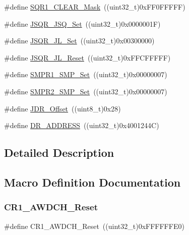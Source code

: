 \begin{DoxyCompactItemize}
\item 
\#define \mbox{\hyperlink{group___a_d_c___private___defines_ga6e3e238f38d7ff17939cbd5417fc51cc}{S\+Q\+R1\+\_\+\+C\+L\+E\+A\+R\+\_\+\+Mask}}~((uint32\+\_\+t)0x\+F\+F0\+F\+F\+F\+F\+F)
\item 
\#define \mbox{\hyperlink{group___a_d_c___private___defines_ga5d460390dbe3b400b5e0fdf1e94929f0}{J\+S\+Q\+R\+\_\+\+J\+S\+Q\+\_\+\+Set}}~((uint32\+\_\+t)0x0000001\+F)
\item 
\#define \mbox{\hyperlink{group___a_d_c___private___defines_ga46af9e738702305be0127f6c15c4f7b0}{J\+S\+Q\+R\+\_\+\+J\+L\+\_\+\+Set}}~((uint32\+\_\+t)0x00300000)
\item 
\#define \mbox{\hyperlink{group___a_d_c___private___defines_gac8d1173791ea10bac7c53a368d593a16}{J\+S\+Q\+R\+\_\+\+J\+L\+\_\+\+Reset}}~((uint32\+\_\+t)0x\+F\+F\+C\+F\+F\+F\+F\+F)
\item 
\#define \mbox{\hyperlink{group___a_d_c___private___defines_ga244048ec3ba9461a6609942def9a15ba}{S\+M\+P\+R1\+\_\+\+S\+M\+P\+\_\+\+Set}}~((uint32\+\_\+t)0x00000007)
\item 
\#define \mbox{\hyperlink{group___a_d_c___private___defines_ga6555beb1970c42125678d80530bba4d3}{S\+M\+P\+R2\+\_\+\+S\+M\+P\+\_\+\+Set}}~((uint32\+\_\+t)0x00000007)
\item 
\#define \mbox{\hyperlink{group___a_d_c___private___defines_ga5671a68d6f0d01c6c465ee7a3a8f3eea}{J\+D\+R\+\_\+\+Offset}}~((uint8\+\_\+t)0x28)
\item 
\#define \mbox{\hyperlink{group___a_d_c___private___defines_ga35ecb1c96cfae175f5f00490e5e91e88}{D\+R\+\_\+\+A\+D\+D\+R\+E\+SS}}~((uint32\+\_\+t)0x4001244\+C)
\end{DoxyCompactItemize}


\subsection{Detailed Description}


\subsection{Macro Definition Documentation}
\mbox{\label{group___a_d_c___private___defines_gabe7e68383d281e58707a1cd749a3374e}} 
\subsubsection{\texorpdfstring{CR1\_AWDCH\_Reset}{CR1\_AWDCH\_Reset}}
{\footnotesize\ttfamily \#define C\+R1\+\_\+\+A\+W\+D\+C\+H\+\_\+\+Reset~((uint32\+\_\+t)0x\+F\+F\+F\+F\+F\+F\+E0)}


